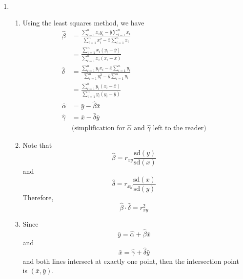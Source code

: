 \documentclass{article}
\begin{document}
\begin{enumerate}
    \item 
    \begin{enumerate}
        \item Using the least squares method, we have
        \begin{align*}
            \hat{\beta}&=\frac{\sum_{i=1}^{n}x_iy_i-\bar{y}\sum_{i=1}^{n}x_i}{\sum_{i=1}^{n}x_i^2-\bar{x}\sum_{i=1}^{n}x_i}\\
            &=\frac{\sum_{i=1}^{n}x_i(y_i-\bar{y})}{\sum_{i=1}^{n}x_i(x_i-\bar{x})}\\
            \hat{\delta}&=\frac{\sum_{i=1}^{n}y_ix_i-\bar{x}\sum_{i=1}^{n}y_i}{\sum_{i=1}^{n}y_i^2-\bar{y}\sum_{i=1}^{n}y_i}\\
            &=\frac{\sum_{i=1}^{n}y_i(x_i-\bar{x})}{\sum_{i=1}^{n}y_i(y_i-\bar{y})}\\
            \hat{\alpha}&=\bar{y}-\hat{\beta}\bar{x}\\
            \hat{\gamma}&=\bar{x}-\hat{\delta}\bar{y}\\
            &\text{(simplification for }\hat{\alpha}\text{ and }\hat{\gamma}\text{ left to the reader)}
        \end{align*}
        
        \item Note that
        \[\hat{\beta}=r_{xy}\frac{\text{sd}(y)}{\text{sd}(x)}\]
        and
        \[\hat{\delta}=r_{xy}\frac{\text{sd}(x)}{\text{sd}(y)}\]
        Therefore,
        \[\hat{\beta}\cdot\hat{\delta}=r_{xy}^2\]
        
        \item Since \[\bar{y}=\hat{\alpha}+\hat{\beta}\bar{x}\]
        and
        \[\bar{x}=\hat{\gamma}+\hat{\delta}\bar{y}\]
        and both lines intersect at exactly one point, then the intersection point is $(\bar{x},\bar{y})$.
    \end{enumerate}
    

\end{enumerate}
\end{document}
